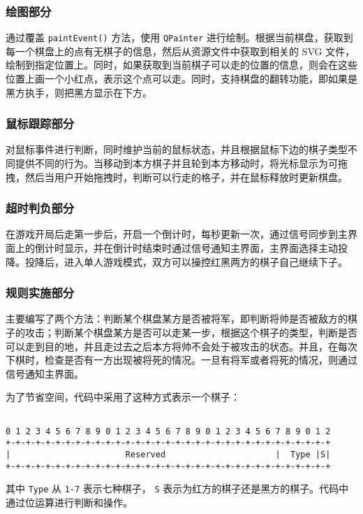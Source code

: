 \documentclass[11pt]{article}
\begin{document}
\subsubsection{绘图部分}
\label{sec:org893c2b5}
通过覆盖 \texttt{paintEvent()} 方法，使用 \texttt{QPainter} 进行绘制。根据当前棋盘，获取到每一个棋盘上的点有无棋子的信息，然后从资源文件中获取到相关的 SVG 文件，绘制到指定位置上。同时，如果获取到当前棋子可以走的位置的信息，则会在这些位置上画一个小红点，表示这个点可以走。同时，支持棋盘的翻转功能，即如果是黑方执手，则把黑方显示在下方。
\subsubsection{鼠标跟踪部分}
\label{sec:org4e0589d}
对鼠标事件进行判断，同时维护当前的鼠标状态，并且根据鼠标下边的棋子类型不同提供不同的行为。当移动到本方棋子并且轮到本方移动时，将光标显示为可拖拽，然后当用户开始拖拽时，判断可以行走的格子，并在鼠标释放时更新棋盘。
\subsubsection{超时判负部分}
\label{sec:orgacf5e44}
在游戏开局后走第一步后，开启一个倒计时，每秒更新一次，通过信号同步到主界面上的倒计时显示，并在倒计时结束时通过信号通知主界面，主界面选择主动投降。投降后，进入单人游戏模式，双方可以操控红黑两方的棋子自己继续下子。
\subsubsection{规则实施部分}
\label{sec:orgfac8fc5}
主要编写了两个方法：判断某个棋盘某方是否被将军，即判断将帅是否被敌方的棋子的攻击；判断某个棋盘某方是否可以走某一步，根据这个棋子的类型，判断是否可以走到目的地，并且走过去之后本方将帅不会处于被攻击的状态。并且，在每次下棋时，检查是否有一方出现被将死的情况。一旦有将军或者将死的情况，则通过信号通知主界面。

为了节省空间，代码中采用了这种方式表示一个棋子：

\begin{verbatim}

0 1 2 3 4 5 6 7 8 9 0 1 2 3 4 5 6 7 8 9 0 1 2 3 4 5 6 7 8 9 0 1 2
+-+-+-+-+-+-+-+-+-+-+-+-+-+-+-+-+-+-+-+-+-+-+-+-+-+-+-+-+-+-+-+-+
|                       Reserved                      |  Type |S|
+-+-+-+-+-+-+-+-+-+-+-+-+-+-+-+-+-+-+-+-+-+-+-+-+-+-+-+-+-+-+-+-+

\end{verbatim}

其中 \texttt{Type} 从 \texttt{1-7} 表示七种棋子， \texttt{S} 表示为红方的棋子还是黑方的棋子。代码中通过位运算进行判断和操作。
\end{document}
